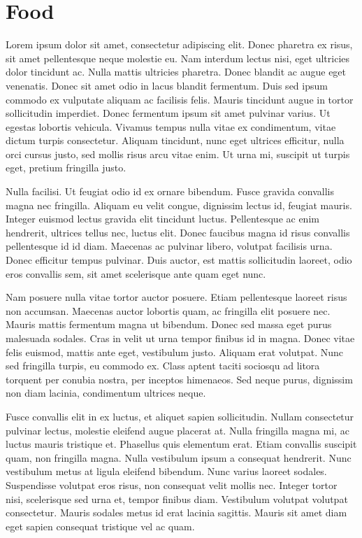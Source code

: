 \chapter{Food}

Lorem ipsum dolor sit amet, consectetur adipiscing
elit. Donec pharetra ex risus, sit amet pellentesque
neque molestie eu. Nam interdum lectus nisi, eget
ultricies dolor tincidunt ac. Nulla mattis ultricies
pharetra. Donec blandit ac augue eget venenatis.
Donec sit amet odio in lacus blandit fermentum. Duis
sed ipsum commodo ex vulputate aliquam ac facilisis
felis. Mauris tincidunt augue in tortor sollicitudin
imperdiet. Donec fermentum ipsum sit amet pulvinar
varius. Ut egestas lobortis vehicula. Vivamus tempus
nulla vitae ex condimentum, vitae dictum turpis
consectetur. Aliquam tincidunt, nunc eget ultrices
efficitur, nulla orci cursus justo, sed mollis risus
arcu vitae enim. Ut urna mi, suscipit ut turpis
eget, pretium fringilla justo.

Nulla facilisi. Ut feugiat odio id ex ornare
bibendum. Fusce gravida convallis magna nec
fringilla. Aliquam eu velit congue, dignissim lectus
id, feugiat mauris. Integer euismod lectus gravida
elit tincidunt luctus. Pellentesque ac enim
hendrerit, ultrices tellus nec, luctus elit. Donec
faucibus magna id risus convallis pellentesque id id
diam. Maecenas ac pulvinar libero, volutpat
facilisis urna. Donec efficitur tempus pulvinar.
Duis auctor, est mattis sollicitudin laoreet, odio
eros convallis sem, sit amet scelerisque ante quam
eget nunc.

Nam posuere nulla vitae tortor auctor posuere. Etiam
pellentesque laoreet risus non accumsan. Maecenas
auctor lobortis quam, ac fringilla elit posuere nec.
Mauris mattis fermentum magna ut bibendum. Donec sed
massa eget purus malesuada sodales. Cras in velit ut
urna tempor finibus id in magna. Donec vitae felis
euismod, mattis ante eget, vestibulum justo. Aliquam
erat volutpat. Nunc sed fringilla turpis, eu commodo
ex. Class aptent taciti sociosqu ad litora torquent
per conubia nostra, per inceptos himenaeos. Sed
neque purus, dignissim non diam lacinia, condimentum
ultrices neque.

Fusce convallis elit in ex luctus, et aliquet sapien
sollicitudin. Nullam consectetur pulvinar lectus,
molestie eleifend augue placerat at. Nulla fringilla
magna mi, ac luctus mauris tristique et. Phasellus
quis elementum erat. Etiam convallis suscipit quam,
non fringilla magna. Nulla vestibulum ipsum a
consequat hendrerit. Nunc vestibulum metus at ligula
eleifend bibendum. Nunc varius laoreet sodales.
Suspendisse volutpat eros risus, non consequat velit
mollis nec. Integer tortor nisi, scelerisque sed
urna et, tempor finibus diam. Vestibulum volutpat
volutpat consectetur. Mauris sodales metus id erat
lacinia sagittis. Mauris sit amet diam eget sapien
consequat tristique vel ac quam.


